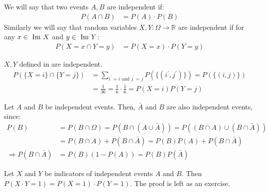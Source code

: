 \begin{definition}
  We will say that two events $A,B$ are independent if:
\begin{equation*}
    \begin{split}
      P(A \cap B) &= P(A) \cdot P (B) %
    \end{split}
  \end{equation*}
  Similarly we will say that random variables $X,Y : \Omega \rightarrow \mathbb{R}$  are independent if for any $x\in \text{ Im } X$ and $y \in \text{ Im } Y$:   
  \begin{equation*}
    \begin{split}
      P(X = x \cap Y = y) &= P(X = x) \cdot P (Y = y) %
    \end{split}
  \end{equation*}
  \end{definition}
  \begin{example}
    $X,Y$ defined in  are independent. 
    \begin{equation*}
      \begin{split}
        P(\{X = i\} \cap \{Y = j\} ) &= \sum_{i^{\prime} = i \text{ and } j^{\prime}=j }P(\{(i^{\prime}, j^{\prime})\}) = P(\{ (i,j) \} ) \\ 
        &= \frac{1}{36} = \frac{1}{6} \cdot \frac{1}{6}  = P(X = i)P(Y = j)
      \end{split}
    \end{equation*}
  \end{example}

  \begin{example}
    Let $A$ and $B$ be independent events. Then, $\bar{A}$ and $B$ are also independent events, since:
    \begin{equation*}
      \begin{split}
    P(B) &= P(B \cap \Omega) = P(B \cap (A \cup \bar{A})) = P((B \cap A) \cup (B \cap \bar{A}))\\
    &= P(B \cap A) + P(B \cap \bar{A}) = P(B)P(A) +    P(B \cap \bar{A} ) \\
    \Rightarrow  P(B \cap \bar{A} ) & = P(B)(1 - P(A)) = P(B)P(\bar{A})
      \end{split}
    \end{equation*}
  \end{example}

  \begin{example}
    Let $X$ and $Y$ be indicators of independent events $A$ and $B$. Then $P(X\cdot Y = 1) = P(X = 1)\cdot P(Y = 1)$. The proof is left as an exercise.
  \end{example}

